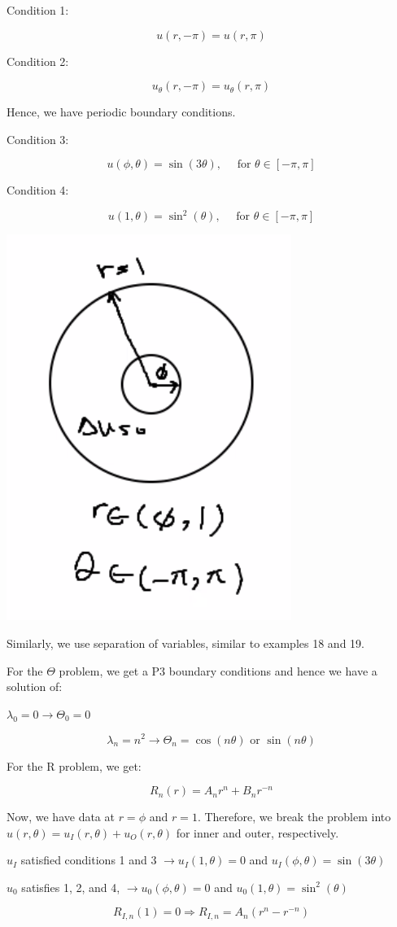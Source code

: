 \documentclass{article}
\begin{document}
Condition 1:

$$u(r, - \pi) = u(r, \pi)$$

Condition 2:

$$u_{\theta} (r, - \pi) = u_{\theta} (r, \pi)$$

Hence, we have periodic boundary conditions. 

Condition 3:

$$u(\phi, \theta) = \sin(3 \theta), \quad \text{ for } \theta \in [-\pi, \pi]$$

Condition 4:

$$u(1, \theta) = \sin^2 (\theta), \quad \text{ for } \theta \in [-\pi, \pi]$$


\begin{center}
    \includegraphics[width = 0.3 \textwidth]{6.png}
\end{center}


Similarly, we use separation of variables, similar to examples 18 and 19. 

For the $\Theta$ problem, we get a P3 boundary conditions and hence we have a solution of:

$\lambda_0 = 0 \to \Theta_0 = 0$

$$\lambda_n = n^2 \to \Theta_n = \cos(n \theta) \text{ or } \sin(n \theta)$$

For the R problem, we get:

$$R_n(r) = A_n r^n + B_n r^{-n}$$

Now, we have data at $r = \phi$ and $r = 1$. Therefore, we break the problem into $u(r, \theta) = u_{I} (r, \theta) + u_{O} (r, \theta)$ for inner and outer, respectively. 

$u_I$ satisfied conditions 1 and 3 $\to u_I (1, \theta) = 0$ and $u_I (\phi, \theta) = \sin(3 \theta)$

$u_0$ satisfies 1, 2, and 4, $\to u_0(\phi, \theta) = 0$ and $u_0 (1, \theta) = \sin^2 (\theta)$

$$R_{I,n}(1) = 0 \Rightarrow R_{I,n} = A_n (r^n - r^{-n})$$
\end{document}
